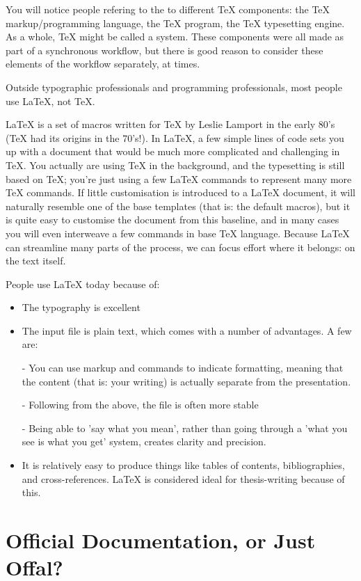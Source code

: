\documentclass[11pt, oneside]{memoir}
\begin{document}
You will notice people refering to the to different TeX components: the TeX markup/programming language, the TeX program, the TeX typesetting engine. As a whole, TeX might be called a system. These components were all made as part of a synchronous workflow, but there is good reason to consider these elements of the workflow separately, at times.

Outside typographic professionals and programming professionals, most people use \LaTeX{}, not \TeX{}.

LaTeX is a set of macros written for TeX by Leslie Lamport in the early 80's (TeX had its origins in the 70's!). In LaTeX, a few simple lines of code sets you up with a document that would be much more complicated and challenging in TeX. You actually are using TeX in the background, and the typesetting is still based on TeX; you're just using a few LaTeX commands to represent many more TeX commands. If little customisation is introduced to a LaTeX document, it will naturally resemble one of the base templates (that is: the default macros), but it is quite easy to customise the document from this baseline, and in many cases you will even interweave a few commands in base TeX language. Because LaTeX can streamline many parts of the process, we can focus effort where it belongs: on the text itself.

People use LaTeX today because of:
\begin{itemize}
    \item The typography is excellent
    \item The input file is plain text, which comes with a number of advantages. A few are:
    \item[-] You can use markup and commands to indicate formatting, meaning that the content (that is: your writing) is actually separate from the presentation.
    \item[-] Following from the above, the file is often more stable
    \item[-] Being able to 'say what you mean', rather than going through a 'what you see is what you get' system, creates clarity and precision.
    \item It is relatively easy to produce things like tables of contents, bibliographies, and cross-references. LaTeX is considered ideal for thesis-writing because of this.
\end{itemize}

\section*{Official Documentation, or Just Offal?}
\end{document}
